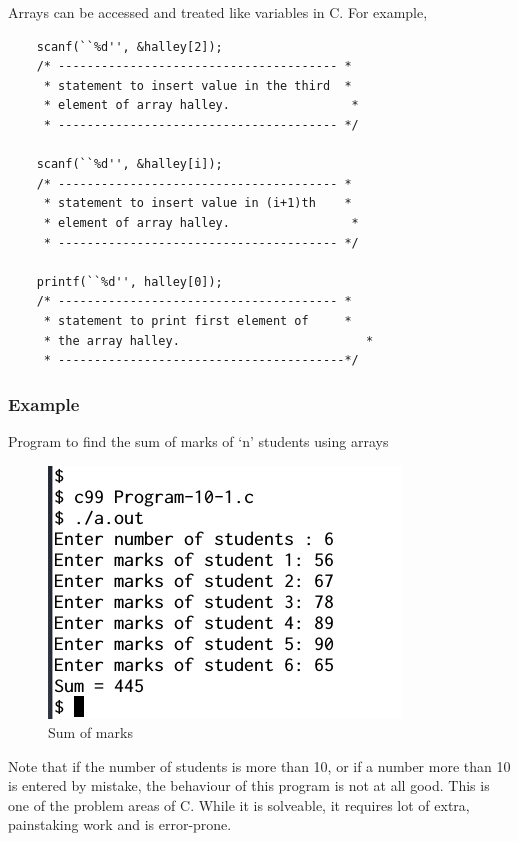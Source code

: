 \documentclass[11pt,a4paper]{article}
\begin{document}
Arrays can be accessed and treated like variables in  C. For example,

\begin{lstlisting}
    scanf(``%d'', &halley[2]);
    /* --------------------------------------- *
     * statement to insert value in the third  *
     * element of array halley.                 *
     * --------------------------------------- */

    scanf(``%d'', &halley[i]);
    /* --------------------------------------- *
     * statement to insert value in (i+1)th    *
     * element of array halley.                 *
     * --------------------------------------- */

    printf(``%d'', halley[0]);
    /* --------------------------------------- *
     * statement to print first element of     *
     * the array halley.                          *
     * ----------------------------------------*/
\end{lstlisting}

\subsubsection*{Example} 
Program to find the sum of marks of `n' students using arrays


\begin{figure}[ht]
\begin{center}
\includegraphics[scale=0.6]{Output-10-1.png}
\caption{Sum of marks}
\label{output-10-1}
\end{center}
\end{figure}

Note that if the number of students is more than 10, or if a number more than 10 is entered by mistake, the behaviour of this program is not at all good. This is one of the problem areas of C. While it is solveable, it requires lot of extra, painstaking work and is error-prone.
 
\end{document}

